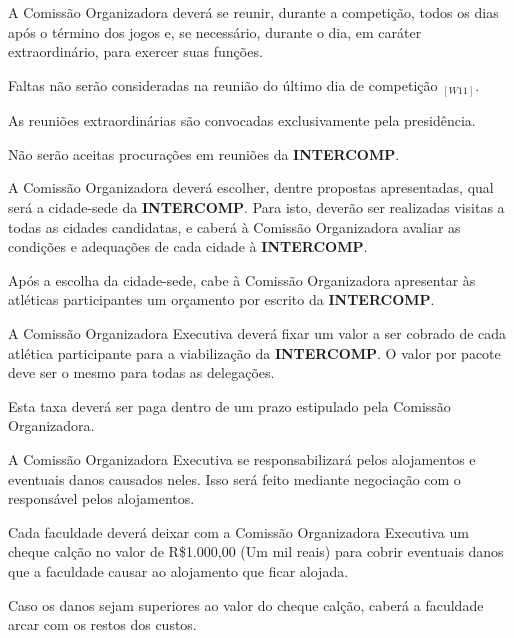 \begin{article}
	A Comissão Organizadora deverá se reunir, durante a competição, todos os dias após o término dos jogos e, se necessário, durante o dia, em caráter extraordinário, para exercer suas funções.

	\begin{xparagraph}
		Faltas não serão consideradas na reunião do último dia de competição $_{[W11]}$.
	\end{xparagraph}

	\begin{xparagraph}
		As reuniões extraordinárias são convocadas exclusivamente pela presidência.
	\end{xparagraph}
\end{article}

\begin{article}
	Não serão aceitas procurações em reuniões da \textbf{INTERCOMP}.
\end{article}

\begin{article}
	A Comissão Organizadora deverá escolher, dentre propostas apresentadas, qual será a cidade-sede da \textbf{INTERCOMP}. Para isto, deverão ser realizadas visitas a todas as cidades candidatas, e caberá à Comissão Organizadora avaliar as condições e adequações de cada cidade à \textbf{INTERCOMP}.

	\begin{xparagraph}
		Após a escolha da cidade-sede, cabe à Comissão Organizadora apresentar às atléticas participantes um orçamento por escrito da \textbf{INTERCOMP}.
	\end{xparagraph}

	\begin{xparagraph}
		A Comissão Organizadora Executiva deverá fixar um valor a ser cobrado de cada atlética participante para a viabilização da \textbf{INTERCOMP}. O valor por pacote deve ser o mesmo para todas as delegações.
	\end{xparagraph}

	\begin{xparagraph}
		Esta taxa deverá ser paga dentro de um prazo estipulado pela Comissão Organizadora.
	\end{xparagraph}

	\begin{xparagraph}
		A Comissão Organizadora Executiva se responsabilizará pelos alojamentos e eventuais danos causados neles. Isso será feito mediante negociação com o responsável pelos alojamentos.
	\end{xparagraph}

	\begin{xparagraph}
		Cada faculdade deverá deixar com a Comissão Organizadora Executiva um cheque calção no valor de R\$1.000,00 (Um mil reais) para cobrir eventuais danos que a faculdade causar ao alojamento que ficar alojada.
	\end{xparagraph}

	\begin{xparagraph}
		Caso os danos sejam superiores ao valor do cheque calção, caberá a faculdade arcar com os restos dos custos.
	\end{xparagraph}
\end{article}

